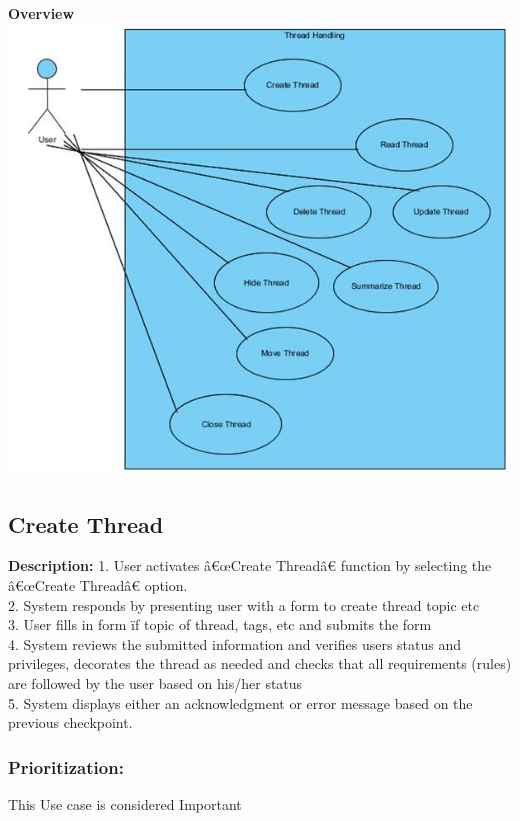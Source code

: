 \documentclass[a4paper,11pt]{article}
\begin{document}
\textbf{Overview}\\
\includegraphics[width=1\linewidth]{./Images/OverviewDiagrams/ThreadHandlingOverview.jpg}\\
\subsection{Create Thread}
\textbf{Description:}
1.	User activates â€œCreate Threadâ€ function by selecting the â€œCreate Threadâ€ option.\\
2.	System responds by presenting user with a form to create thread topic etc\\
3.	User fills in form ïƒ  topic of thread, tags, etc and submits the form\\
4.	System reviews the submitted information and  verifies users status and privileges, decorates the thread as needed and checks that all requirements (rules) are followed by the user based on his/her status\\
5.	 System displays either an acknowledgment or error message based on the previous checkpoint.
\subsubsection{Prioritization:} 
This Use case is considered Important
\end{document}
